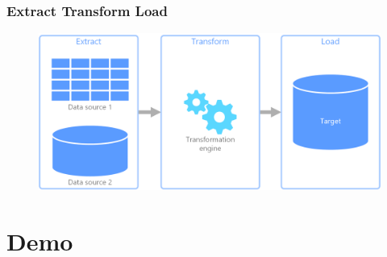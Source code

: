 \documentclass{beamer}
\begin{document}
\begin{frame}

\frametitle{Extract Transform Load}

  \begin{figure}
    \centering
    \includegraphics[width=\textwidth]{etl.png}
  \end{figure}

\end{frame}

\section{Demo}
\end{document}
